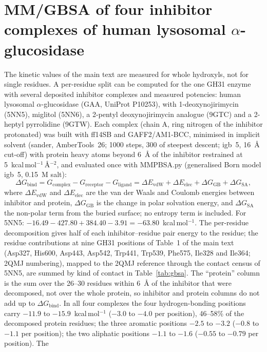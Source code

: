 \documentclass[preprint,12pt]{elsarticle}
\begin{document}
\section{MM/GBSA of four inhibitor complexes of human lysosomal $\alpha$-glucosidase}
The kinetic values of the main text are measured for whole hydroxyls, not for single
residues. A per-residue split can be computed for the
one GH31 enzyme with several deposited inhibitor complexes and measured potencies: human
lysosomal $\alpha$-glucosidase (GAA, UniProt P10253), with 1-deoxynojirimycin (5NN5),
miglitol (5NN6), a 2-pentyl deoxynojirimycin analogue (9GTC) and a 2-heptyl pyrrolidine
(9GTW). Each complex (chain A, ring nitrogen of the inhibitor protonated) was built with
ff14SB and GAFF2/AM1-BCC, minimised in implicit solvent (sander, AmberTools~26; 1000 steps, 300 of steepest descent;
igb~5, 16~\AA{} cut-off) with protein heavy atoms beyond 6~\AA{} of the inhibitor restrained
at 5~kcal\,mol$^{-1}$\,\AA$^{-2}$, and evaluated once with MMPBSA.py (generalised Born
model igb~5, 0.15~M salt):
\begin{equation}
\Delta G_\mathrm{bind} = G_\mathrm{complex}-G_\mathrm{receptor}-G_\mathrm{ligand}
= \Delta E_\mathrm{vdW}+\Delta E_\mathrm{elec}+\Delta G_\mathrm{GB}+\Delta G_\mathrm{SA},
\label{eq:gbsa}
\end{equation}
where $\Delta E_\mathrm{vdW}$ and $\Delta E_\mathrm{elec}$ are the van der Waals and
Coulomb energies between inhibitor and protein, $\Delta G_\mathrm{GB}$ is the change in
polar solvation energy, and $\Delta G_\mathrm{SA}$ the non-polar term from the buried surface;
no entropy term is included. For 5NN5: $-16.49-427.80+384.40-3.91=-63.80$~kcal\,mol$^{-1}$.
The per-residue decomposition gives half of each inhibitor--residue pair energy to the residue;
the residue contributions at nine GH31 positions of Table~1 of the main text (Asp327, His600,
Asp443, Asp542, Trp441, Trp539, Phe575, Ile328 and Ile364; 2QMJ numbering), mapped to
the 2QMJ reference through the contact census of 5NN5, are summed by kind of contact in
Table~\ref{tab:gbsa}. The ``protein'' column is the sum over the 26--30 residues within
6~\AA{} of the inhibitor that were decomposed, not over the whole protein, so inhibitor and
protein columns do not add up to $\Delta G_\mathrm{bind}$. In all four complexes the four
hydrogen-bonding positions carry $-11.9$ to $-15.9$~kcal\,mol$^{-1}$ ($-3.0$ to
$-4.0$ per position), 46--58\% of the decomposed protein residues; the
three aromatic positions $-2.5$ to $-3.2$ ($-0.8$ to $-1.1$ per position); the two
aliphatic positions $-1.1$ to $-1.6$ ($-0.55$ to $-0.79$ per position). The
\end{document}

